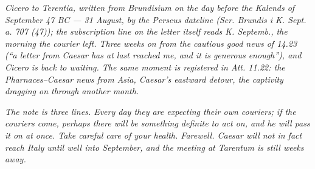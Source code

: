
\textit{Cicero to Terentia, written from Brundisium on the
day before the Kalends of September 47 BC --- 31 August,
by the Perseus dateline (\textit{Scr. Brundis i K. Sept.
a. 707 (47)}); the subscription line on the letter itself
reads \textit{K. Septemb.}, the morning the courier left.
Three weeks on from the cautious good news of 14.23
(``a letter from Caesar has at last reached me, and it
is generous enough''), and Cicero is back to waiting.
The same moment is registered in \textit{Att.} 11.22:
the Pharnaces--Caesar news from Asia, Caesar's eastward
detour, the captivity dragging on through another
month.}

\textit{The note is three lines. Every day they are
expecting their own couriers; if the couriers come,
perhaps there will be something definite to act on, and
he will pass it on at once. Take careful care of your
health. Farewell. Caesar will not in fact reach Italy
until well into September, and the meeting at Tarentum
is still weeks away.}

